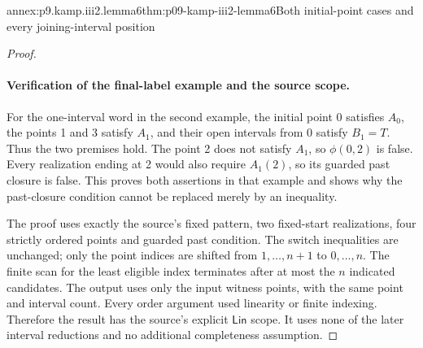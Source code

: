 \begin{annexitem}{annex:p9.kamp.iii2.lemma6}{thm:p09-kamp-iii2-lemma6}{Both initial-point cases and every joining-interval position}
\begin{proof}
\paragraph{Verification of the final-label example and the source scope.}
For the one-interval word in the second example, the initial point 0
satisfies \(A_0\), the points 1 and 3 satisfy \(A_1\), and
their open intervals from 0 satisfy \(B_1=T\). Thus the two
premises hold. The point 2 does not satisfy \(A_1\), so
\(\phi(0,2)\) is false. Every realization ending at 2 would
also require \(A_1(2)\), so its guarded past closure is false.
This proves both assertions in that example and shows why the
past-closure condition cannot be replaced merely by an inequality.

The proof uses exactly the source's fixed pattern, two fixed-start
realizations, four strictly ordered points and guarded past
condition. The switch inequalities are unchanged; only the point
indices are shifted from \(1,\ldots,n+1\) to \(0,\ldots,n\).
The finite scan for the least eligible index terminates after at
most the \(n\) indicated candidates. The output uses only the
input witness points, with the same point and interval count.
Every order argument used linearity or finite indexing. Therefore
the result has the source's explicit \(\mathsf{Lin}\) scope.
It uses none of the later interval reductions and no additional
completeness assumption.
\end{proof}
\end{annexitem}
